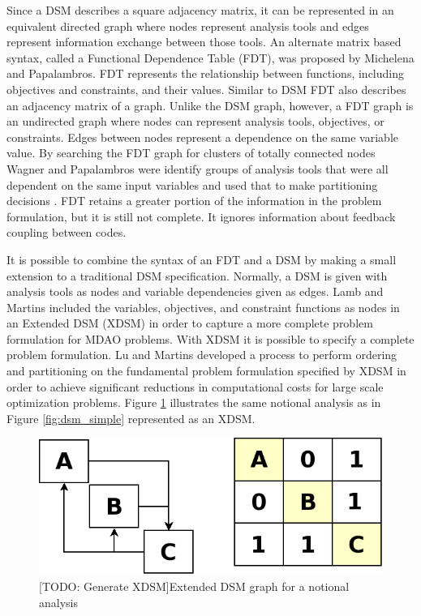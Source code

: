 \documentclass[]{aiaa-tc} %
\begin{document}
    Since a DSM describes a square adjacency matrix, it can be represented in an equivalent directed graph where nodes represent analysis tools and 
    edges represent information exchange between those tools. An alternate matrix based syntax, called a 
    Functional Dependence Table (FDT), was proposed by Michelena and Papalambros. 
    FDT represents the relationship between functions, including objectives and constraints, and their values\cite{Michelena1997}. Similar to DSM
    FDT also describes an adjacency matrix of a graph. Unlike the DSM graph, however, a FDT graph is an undirected 
    graph where nodes can represent analysis tools, objectives, or constraints. Edges between nodes represent a dependence on the same 
    variable value. By searching the FDT graph for clusters of totally connected nodes Wagner and Papalambros were identify groups of 
    analysis tools that were all dependent on the same input variables and used that to make partitioning decisions \cite{Wagner1993}. FDT retains 
    a greater portion of the information in the problem formulation, but it is still not complete. It ignores information about feedback coupling 
    between codes. 

    It is possible to combine the syntax of an FDT and a DSM by making a small extension to a traditional DSM specification. Normally, a DSM is given 
    with analysis tools as nodes and variable dependencies given as edges. Lamb and Martins included the variables, objectives, and constraint functions
    as nodes in an Extended DSM (XDSM)\cite{Lambe2012} in order to capture a more complete problem formulation for MDAO problems. With XDSM 
    it is possible to specify a complete problem formulation. Lu and Martins developed a process to perform ordering and partitioning on the fundamental 
    problem formulation specified by XDSM in order to achieve significant reductions in computational costs for large scale optimization problems. 
    Figure \ref{fig:dsm_full} illustrates the same notional analysis as in Figure \ref{fig:dsm_simple} represented as an XDSM.

    \begin{figure}[!hbp]
        \begin{center}
        \includegraphics[width=.75\textwidth]{images/dsm_simple}
        \caption{[TODO: Generate XDSM]Extended DSM graph for a notional analysis \label{fig:dsm_full}}
        \end{center}
    \end{figure}
\end{document}
